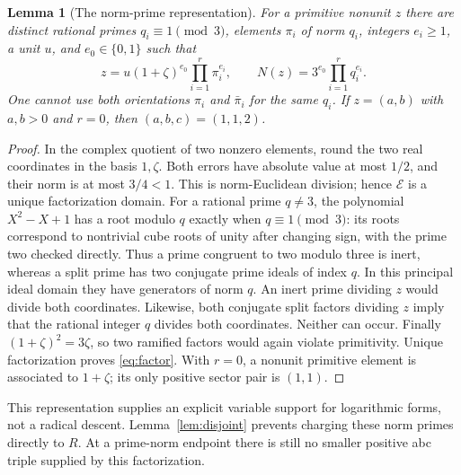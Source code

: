 \documentclass[11pt]{amsart}
\newtheorem{lemma}[theorem]{Lemma}
\theoremstyle{definition}\newtheorem{definition}[theorem]{Definition}
\theoremstyle{remark}\newtheorem{remark}[theorem]{Remark}
\newcommand{\EE}{\mathcal E}\newcommand{\HH}{\mathcal A}
\begin{document}
\begin{lemma}[The norm-prime representation]\label{lem:factors}
For a primitive nonunit $z$ there are distinct rational primes $q_i\equiv1\pmod3$, elements $\pi_i$ of norm $q_i$, integers $e_i\ge1$, a unit $u$, and $e_0\in\{0,1\}$ such that
\begin{equation}\label{eq:factor}
 z=u(1+\zeta)^{e_0}\prod_{i=1}^{r}\pi_i^{e_i},
 \qquad N(z)=3^{e_0}\prod_{i=1}^{r}q_i^{e_i}.
\end{equation}
One cannot use both orientations $\pi_i$ and $\bar\pi_i$ for the same $q_i$. If $z=(a,b)$ with $a,b>0$ and $r=0$, then $(a,b,c)=(1,1,2)$.
\end{lemma}
\begin{proof}
In the complex quotient of two nonzero elements, round the two real coordinates in the basis $1,\zeta$. Both errors have absolute value at most $1/2$, and their norm is at most $3/4<1$. This is norm-Euclidean division; hence $\EE$ is a unique factorization domain.
For a rational prime $q\ne3$, the polynomial $X^2-X+1$ has a root modulo $q$ exactly when $q\equiv1\pmod3$: its roots correspond to nontrivial cube roots of unity after changing sign, with the prime two checked directly. Thus a prime congruent to two modulo three is inert, whereas a split prime has two conjugate prime ideals of index $q$. In this principal ideal domain they have generators of norm $q$. An inert prime dividing $z$ would divide both coordinates. Likewise, both conjugate split factors dividing $z$ imply that the rational integer $q$ divides both coordinates. Neither can occur.
Finally $(1+\zeta)^2=3\zeta$, so two ramified factors would again violate primitivity. Unique factorization proves \eqref{eq:factor}. With $r=0$, a nonunit primitive element is associated to $1+\zeta$; its only positive sector pair is $(1,1)$.
\end{proof}

This representation supplies an explicit variable support for logarithmic forms, not a radical descent. Lemma~\ref{lem:disjoint} prevents charging these norm primes directly to $R$. At a prime-norm endpoint there is still no smaller positive abc triple supplied by this factorization.
\end{document}

